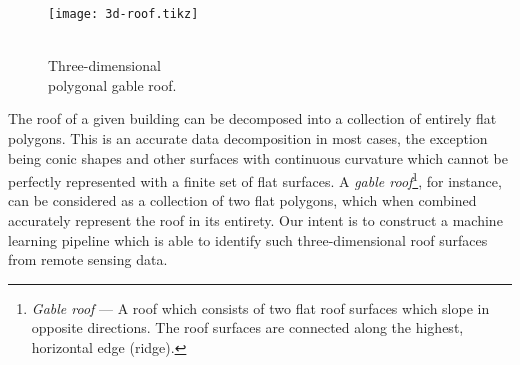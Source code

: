 \begin{wrapfigure}[10]{r}{0.25\textwidth}
  \vspace{-2em}
  \begin{center}
    \texttt{[image: 3d-roof.tikz]}
  \end{center}
  \caption{%
    \\
    Three-dimensional\\polygonal gable roof.
  }%
  \label{fig:gable-roof}
\end{wrapfigure}

The roof of a given building can be decomposed into a collection of entirely flat polygons.
This is an accurate data decomposition in most cases, the exception being conic shapes and other surfaces with continuous curvature which cannot be perfectly represented with a finite set of flat surfaces.
A \emph{gable roof}\footnote{\textit{Gable roof} --- A roof which consists of two flat roof surfaces which slope in opposite directions.
The roof surfaces are connected along the highest, horizontal edge (ridge).}, for instance, can be considered as a collection of two flat polygons, which when combined accurately represent the roof in its entirety.
Our intent is to construct a machine learning pipeline which is able to identify such three-dimensional roof surfaces from remote sensing data.

